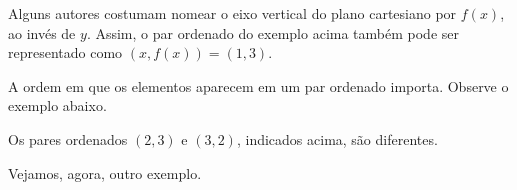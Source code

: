 \documentclass[12pt,openright,twoside,a4paper]{article}
\theoremstyle{definition}
\begin{document}
	Alguns autores costumam nomear o eixo vertical do plano cartesiano por $f(x)$, ao invés de $y$. Assim, o par ordenado do exemplo acima também pode ser representado como $(x, f(x)) = (1,3)$.
	
	A ordem em que os elementos aparecem em um par ordenado importa. Observe o exemplo abaixo.
	
	\begin{center}
	\end{center}
	
	Os pares ordenados $(2,3)$ e $(3,2)$, indicados acima, são diferentes.
	
	Vejamos, agora, outro exemplo.
	
	
\end{document}
